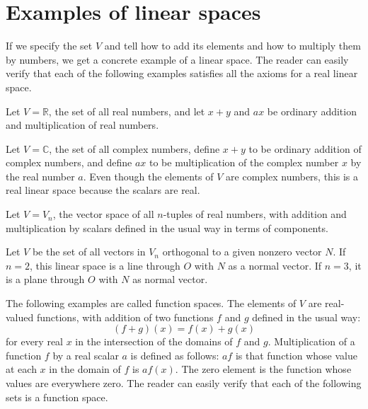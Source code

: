 \documentclass[cn,11pt,chinese]{elegantbook}
\def\real{\mathbb{R}}
\def\complex{\mathbb{C}}
\numberwithin{equation}{section}
\begin{document}
\section{Examples of linear spaces}
If we specify the set $V$ and tell how to add its elements and how to multiply them by numbers, we get a concrete example of a linear space. The reader can easily verify that each of the following examples satisfies all the axioms for a real linear space.

\begin{example}\label{exam020010301}
Let $V = \real$, the set of all real numbers, and let $x + y$ and $ax$ be ordinary addition and multiplication of real numbers.
\end{example}

\begin{example}\label{exam020010302}
Let $V = \complex$, the set of all complex numbers, define $x + y$ to be ordinary addition of complex numbers, and define $ax$ to be multiplication of the complex number $x$ by the real number $a$. Even though the elements of $V$ are complex numbers, this is a real linear space because the scalars are real.
\end{example}

\begin{example}\label{exam020010303}
Let $V = V_n$, the vector space of all $n$-tuples of real numbers, with addition and multiplication by scalars defined in the usual way in terms of components.
\end{example}

\begin{example}\label{exam020010304}
Let $V$ be the set of all vectors in $V_n$ orthogonal to a given nonzero vector $N$. If $n=2$, this linear space is a line through $O$ with $N$ as a normal vector. If $n=3$, it is a plane through $O$ with $N$ as normal vector.
\end{example}

The following examples are called function spaces. The elements of $V$ are real-valued functions, with addition of two functions $f$ and $g$ defined in the usual way:
\[
(f + g)(x) = f(x) + g(x)
\]
for every real $x$ in the intersection of the domains of $f$ and $g$. Multiplication of a function $f$ by a real scalar $a$ is defined as follows: $af$ is that function whose value at each $x$ in the domain of $f$ is $af(x)$. The zero element is the function whose values are everywhere zero. The reader can easily verify that each of the following sets is a function space.
\end{document}
